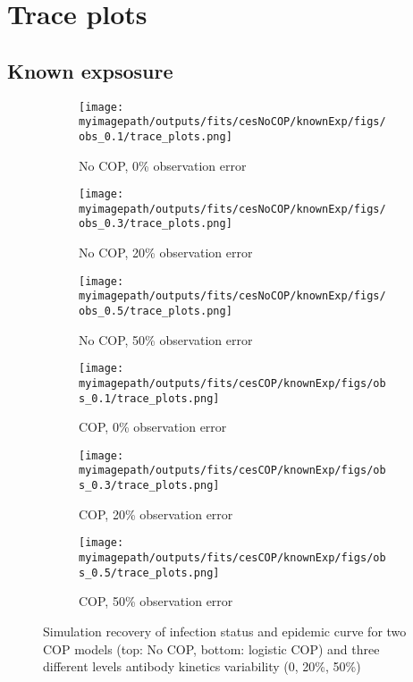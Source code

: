 
\section{Trace plots}
\subsection{Known expsosure}
\begin{figure}[H]
    \centering
    \begin{subfigure}{0.31\textwidth}
        \centering
        \texttt{[image: \\myimagepath/outputs/fits/cesNoCOP/knownExp/figs/obs\_0.1/trace\_plots.png]}
        \caption{No COP, 0\% observation error}
    \end{subfigure}
    \begin{subfigure}{0.31\textwidth}
        \centering
        \texttt{[image: \\myimagepath/outputs/fits/cesNoCOP/knownExp/figs/obs\_0.3/trace\_plots.png]}
        \caption{No COP, 20\% observation error}
    \end{subfigure}
    \begin{subfigure}{0.31\textwidth}
        \centering
        \texttt{[image: \\myimagepath/outputs/fits/cesNoCOP/knownExp/figs/obs\_0.5/trace\_plots.png]}
        \caption{No COP, 50\% observation error}
    \end{subfigure}
    
  \begin{subfigure}{0.31\textwidth}
        \centering
        \texttt{[image: \\myimagepath/outputs/fits/cesCOP/knownExp/figs/obs\_0.1/trace\_plots.png]}
        \caption{ COP, 0\% observation error}
    \end{subfigure}
    \begin{subfigure}{0.31\textwidth}
        \centering
        \texttt{[image: \\myimagepath/outputs/fits/cesCOP/knownExp/figs/obs\_0.3/trace\_plots.png]}
        \caption{ COP, 20\% observation error}
    \end{subfigure}
    \begin{subfigure}{0.31\textwidth}
        \centering
        \texttt{[image: \\myimagepath/outputs/fits/cesCOP/knownExp/figs/obs\_0.5/trace\_plots.png]}
        \caption{ COP, 50\% observation error}
    \end{subfigure}
    
    \caption{Simulation recovery of infection status and epidemic curve for two COP models (top: No COP, bottom: logistic COP) and three different levels antibody kinetics variability (0, 20\%, 50\%)}
\end{figure}


